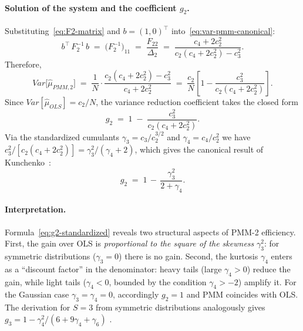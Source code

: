 \documentclass[11pt]{article}
\def\vec#1{#1}%
\def\mathbf#1{#1}%
\def\mathrm#1{#1}%
\theoremstyle{definition}
\newcommand{\Var}{\mathrm{Var}}
\newcommand{\PMM}{\mathrm{PMM}}
\begin{document}
\paragraph{Solution of the system and the coefficient $g_2$.}
Substituting~\eqref{eq:F2-matrix} and $\vec b = (1, 0)^{\top}$
into~\eqref{eq:var-pmm-canonical}:
\begin{equation}\label{eq:b-Finv-b}
  \vec b^{\top}\,\mathbf{F}_2^{-1}\,\vec b
  \;=\; \bigl(\mathbf{F}_2^{-1}\bigr)_{11}
  \;=\; \frac{F_{22}}{\Delta_2}
  \;=\; \frac{c_4 + 2c_2^2}{c_2(c_4 + 2c_2^2) - c_3^2}.
\end{equation}
Therefore,
\begin{equation}\label{eq:var-pmm2}
  \Var\bigl[\hat\mu_{\PMM,2}\bigr]
  \;=\; \frac{1}{N}\cdot\frac{c_2(c_4 + 2c_2^2) - c_3^2}{c_4 + 2c_2^2}
  \;=\; \frac{c_2}{N}
        \left[1 - \frac{c_3^2}{c_2(c_4 + 2c_2^2)}\right].
\end{equation}
Since $\Var[\hat\mu_{\mathrm{OLS}}] = c_2/N$, the variance reduction
coefficient takes the closed form
\begin{equation}\label{eq:g2-final}
  g_2 \;=\; 1 \;-\; \frac{c_3^2}{c_2(c_4 + 2c_2^2)}.
\end{equation}
Via the standardized cumulants $\gamma_3 = c_3 / c_2^{3/2}$ and
$\gamma_4 = c_4/c_2^2$ we have
$c_3^2/[c_2(c_4 + 2c_2^2)] = \gamma_3^2 / (\gamma_4 + 2)$, which gives
the canonical result of Kunchenko~\citep[formula~2.18]{kunchenko2002}:
\begin{equation}\label{eq:g2-standardized}
  \boxed{\,g_2 \;=\; 1 \,-\, \frac{\gamma_3^2}{2 + \gamma_4}.\,}
\end{equation}

\paragraph{Interpretation.}
Formula~\eqref{eq:g2-standardized} reveals two structural aspects of
PMM-2 efficiency.
First, the gain over OLS is \emph{proportional to the square of the
skewness} $\gamma_3^2$: for symmetric distributions ($\gamma_3 = 0$) there
is no gain. Second, the kurtosis $\gamma_4$ enters as a ``discount factor''
in the denominator: heavy tails (large $\gamma_4 > 0$) reduce the gain,
while light tails ($\gamma_4 < 0$, bounded by the condition
$\gamma_4 > -2$) amplify it. For the Gaussian case
$\gamma_3 = \gamma_4 = 0$, accordingly $g_2 = 1$ and PMM coincides with
OLS. The derivation for $S = 3$ from symmetric distributions analogously
gives $g_3 = 1 - \gamma_4^2/(6 + 9\gamma_4 + \gamma_6)$
\citep{zabolotnii2019symmetric}.
\end{document}
